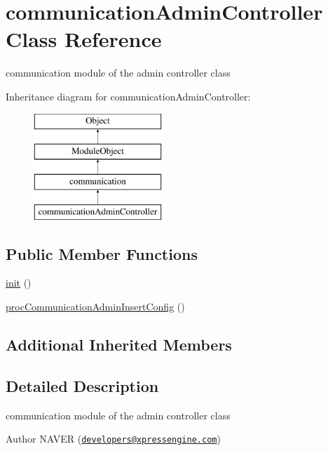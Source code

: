 \hypertarget{classcommunicationAdminController}{\section{communication\-Admin\-Controller Class Reference}
\label{classcommunicationAdminController}
}


communication module of the admin controller class  


Inheritance diagram for communication\-Admin\-Controller\-:\begin{figure}[H]
\begin{center}
\leavevmode
\includegraphics[height=4.000000cm]{classcommunicationAdminController}
\end{center}
\end{figure}
\subsection*{Public Member Functions}
\begin{DoxyCompactItemize}
\item 
\hyperlink{classcommunicationAdminController_a6ad0b759ad3a139a7cf0784f62297bfb}{init} ()
\item 
\hyperlink{classcommunicationAdminController_a23dbacf4acc643cea069d1de93b406c9}{proc\-Communication\-Admin\-Insert\-Config} ()
\end{DoxyCompactItemize}
\subsection*{Additional Inherited Members}


\subsection{Detailed Description}
communication module of the admin controller class 

\begin{DoxyAuthor}{Author}
N\-A\-V\-E\-R (\href{mailto:developers@xpressengine.com}{\tt developers@xpressengine.\-com}) 
\end{DoxyAuthor}


